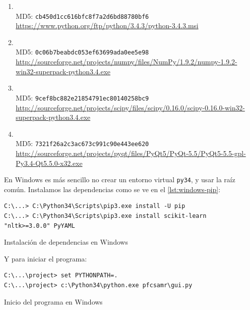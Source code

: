 \begin{enumerate}
\item {} \\
MD5: \texttt{cb450d1cc616bfc8f7a2d6bd88780bf6} \\
\url{https://www.python.org/ftp/python/3.4.3/python-3.4.3.msi}
\item {} \\
MD5: \texttt{0c06b7beabdc053ef63699ada0ee5e98} \\
\url{http://sourceforge.net/projects/numpy/files/NumPy/1.9.2/numpy-1.9.2-win32-superpack-python3.4.exe}
\item {} \\
MD5: \texttt{9cef8bc882e21854791ec80140258bc9} \\
\url{http://sourceforge.net/projects/scipy/files/scipy/0.16.0/scipy-0.16.0-win32-superpack-python3.4.exe}
\item {} \\
MD5: \texttt{7321f26a2c3ac673c991c90e443ee620} \\
\url{http://sourceforge.net/projects/pyqt/files/PyQt5/PyQt-5.5/PyQt5-5.5-gpl-Py3.4-Qt5.5.0-x32.exe}
\end{enumerate}

En Windows es más sencillo no crear un entorno virtual \texttt{py34}, y usar la raíz común. Instalamos las dependencias como se ve en el \autoref{lst:windows-pip}:

\begin{listing}[htbp]
\begin{verbatim}
C:\...> C:\Python34\Scripts\pip3.exe install -U pip
C:\...> C:\Python34\Scripts\pip3.exe install scikit-learn "nltk>=3.0.0" PyYAML
\end{verbatim}
\caption{Instalación de dependencias en Windows}
\label{lst:windows-pip}
\end{listing}
\FloatBarrier

Y para iniciar el programa:

\begin{listing}[htbp]
\begin{verbatim}
C:\...\project> set PYTHONPATH=.
C:\...\project> c:\Python34\python.exe pfcsamr\gui.py
\end{verbatim}
\caption{Inicio del programa en Windows}
\label{lst:windows-inicio}
\end{listing}
\FloatBarrier


